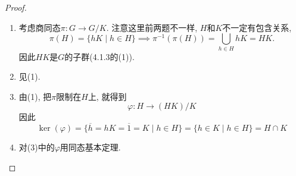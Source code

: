 \documentclass{../solutions-cn}
\begin{document}
\begin{proof}
    \begin{enumerate}[(1)]
        \item 考虑商同态$\pi:G \to G/K$. 注意这里前两题不一样, $H$和$K$不一定有包含关系, 
        \[
            \pi(H) = \{hK \mid h \in H\} \implies \pi^{-1}(\pi(H)) = \bigcup_{h \in H} hK = HK.
        \]
        因此$HK$是$G$的子群(4.1.3的(1)).
        \item 见(1).
        \item 由(1), 把$\pi$限制在$H$上, 就得到
        \[
            \varphi:H \to (HK)/K
        \]
        因此
        \[
            \ker(\varphi) = \{\overline{h} = hK = \overline{1} = K \mid h \in H\} = \{h \in K \mid h \in H\} = H \cap K
        \]
        \item 对(3)中的$\varphi$用同态基本定理.
    \end{enumerate}
\end{proof}
\end{document}
